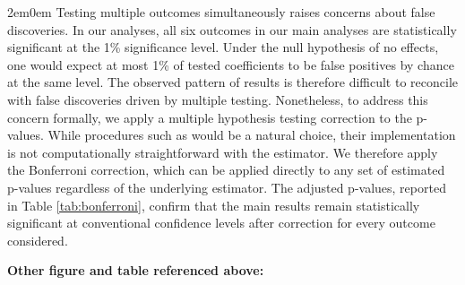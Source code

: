 \begin{adjustwidth}{2em}{0em}
Testing multiple outcomes simultaneously raises concerns about false discoveries. In our analyses, all six outcomes in our main analyses are statistically significant at the 1\% significance level. Under the null hypothesis of no effects, one would expect at most 1\% of tested coefficients to be false positives by chance at the same level. The observed pattern of results is therefore difficult to reconcile with false discoveries driven by multiple testing. Nonetheless, to address this concern formally, we apply a multiple hypothesis testing correction to the p-values. While procedures such as \citet{romano2005} would be a natural choice, their implementation is not computationally straightforward with the \citet{Callaway} estimator. We therefore apply the Bonferroni correction, which can be applied directly to any set of estimated p-values regardless of the underlying estimator. The adjusted p-values, reported in Table \ref{tab:bonferroni}, confirm that the main results remain statistically significant at conventional confidence levels after correction for every outcome considered.
\end{adjustwidth}

\clearpage
\noindent\textbf{Other figure and table referenced above:}
\vspace{0.5em}

{\setcounter{figure}{1}\renewcommand{\thefigure}{\arabic{figure}}
}

\clearpage

{\renewcommand{\thetable}{C.2}
}

\clearpage



